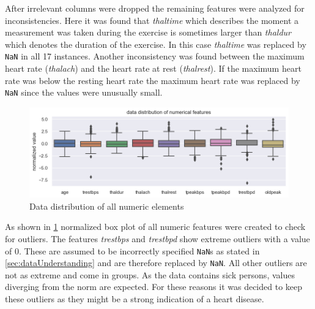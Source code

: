 After irrelevant columns were dropped the remaining features were analyzed for inconsistencies. Here it was found that \textit{thaltime} which describes the moment a measurement was taken during the exercise is sometimes larger than \textit{thaldur} which denotes the duration of the exercise. In this case \textit{thaltime} was replaced by \texttt{NaN} in all 17 instances. Another inconsistency was found between the maximum heart rate (\textit{thalach}) and the heart rate at rest (\textit{thalrest}). If the maximum heart rate was below the resting heart rate the maximum heart rate was replaced by \texttt{NaN} since the values were unusually small.

\begin{figure}[h]
	\centering
	\includegraphics[width=\textwidth]{images/dataDistribution.png}
	\caption{Data distribution of all numeric elements}
	\label{fig:dataDistribution}
\end{figure}
As shown in \cref{fig:dataDistribution}  normalized box plot of all numeric features were created to check for outliers. The features \textit{trestbps} and \textit{trestbpd} show extreme outliers with a value of 0. These are assumed to be incorrectly specified \texttt{NaN}s as stated in \cref{sec:dataUnderstanding} and are therefore replaced by \texttt{NaN}. All other outliers are not as extreme and come in groups. As the data contains sick persons, values diverging from the norm are expected. For these reasons it was decided to keep these outliers as they might be a strong indication of a heart disease.

